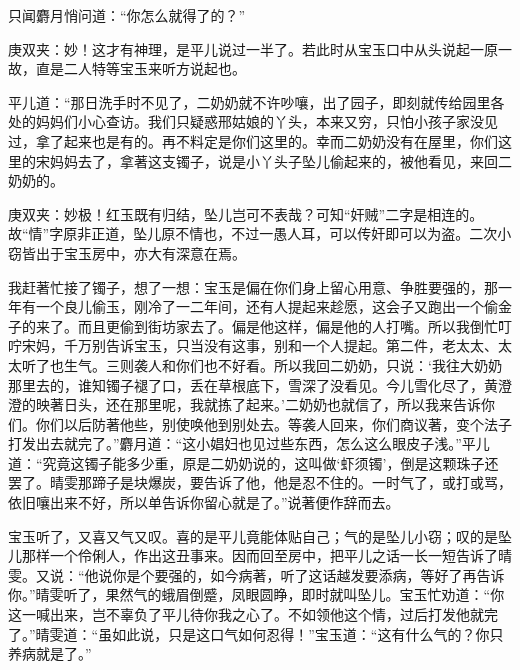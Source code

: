 \begin{parag}
    只闻麝月悄问道：“你怎么就得了的？”\begin{note}庚双夹：妙！这才有神理，是平儿说过一半了。若此时从宝玉口中从头说起一原一故，直是二人特等宝玉来听方说起也。\end{note}平儿道：“那日洗手时不见了，二奶奶就不许吵嚷，出了园子，即刻就传给园里各处的妈妈们小心查访。我们只疑惑邢姑娘的丫头，本来又穷，只怕小孩子家没见过，拿了起来也是有的。再不料定是你们这里的。幸而二奶奶没有在屋里，你们这里的宋妈妈去了，拿著这支镯子，说是小丫头子坠儿偷起来的，被他看见，来回二奶奶的。\begin{note}庚双夹：妙极！红玉既有归结，坠儿岂可不表哉？可知“奸贼”二字是相连的。故“情”字原非正道，坠儿原不情也，不过一愚人耳，可以传奸即可以为盗。二次小窃皆出于宝玉房中，亦大有深意在焉。\end{note}我赶著忙接了镯子，想了一想：宝玉是偏在你们身上留心用意、争胜要强的，那一年有一个良儿偷玉，刚冷了一二年间，还有人提起来趁愿，这会子又跑出一个偷金子的来了。而且更偷到街坊家去了。偏是他这样，偏是他的人打嘴。所以我倒忙叮咛宋妈，千万别告诉宝玉，只当没有这事，别和一个人提起。第二件，老太太、太太听了也生气。三则袭人和你们也不好看。所以我回二奶奶，只说：‘我往大奶奶那里去的，谁知镯子褪了口，丢在草根底下，雪深了没看见。今儿雪化尽了，黄澄澄的映著日头，还在那里呢，我就拣了起来。’二奶奶也就信了，所以我来告诉你们。你们以后防著他些，别使唤他到别处去。等袭人回来，你们商议著，变个法子打发出去就完了。”麝月道：“这小娼妇也见过些东西，怎么这么眼皮子浅。”平儿道：“究竟这镯子能多少重，原是二奶奶说的，这叫做‘虾须镯’，倒是这颗珠子还罢了。晴雯那蹄子是块爆炭，要告诉了他，他是忍不住的。一时气了，或打或骂，依旧嚷出来不好，所以单告诉你留心就是了。”说著便作辞而去。
\end{parag}


\begin{parag}
    宝玉听了，又喜又气又叹。喜的是平儿竟能体贴自己；气的是坠儿小窃；叹的是坠儿那样一个伶俐人，作出这丑事来。因而回至房中，把平儿之话一长一短告诉了晴雯。又说：“他说你是个要强的，如今病著，听了这话越发要添病，等好了再告诉你。”晴雯听了，果然气的蛾眉倒蹙，凤眼圆睁，即时就叫坠儿。宝玉忙劝道：“你这一喊出来，岂不辜负了平儿待你我之心了。不如领他这个情，过后打发他就完了。”晴雯道：“虽如此说，只是这口气如何忍得！”宝玉道：“这有什么气的？你只养病就是了。”
\end{parag}


